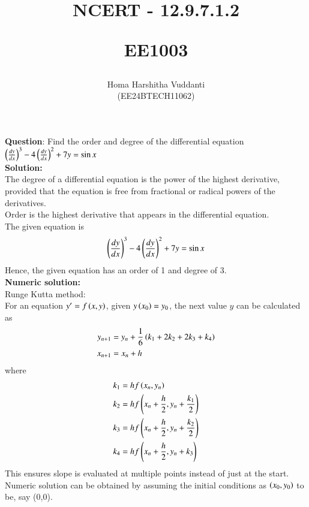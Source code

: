\documentclass[journal]{IEEEtran}
\begin{document}


\title{
NCERT - 12.9.7.1.2

\large{EE1003}
}
\author{Homa Harshitha Vuddanti

(EE24BTECH11062)
}	

\maketitle

\bigskip

\renewcommand{\thefigure}{\theenumi}
\renewcommand{\thetable}{\theenumi}
\textbf{Question}: Find the order and degree of the differential equation $\left(\frac{dy}{dx}\right)^3-4\left(\frac{dy}{dx}\right)^2+7y=\sin x$\\
\textbf{Solution:} \\
The degree of a differential equation is the power of the highest derivative, provided that the equation is free from fractional or radical powers of the derivatives.\\
Order is the highest derivative that appears in the differential equation.\\
The given equation is 
\begin{align}
\left(\frac{dy}{dx}\right)^3-4\left(\frac{dy}{dx}\right)^2+7y=\sin x \label{eq:1}
\end{align}
Hence, the given equation has an order of 1 and degree of 3.\\
\textbf{Numeric solution:}\\
Runge Kutta method:\\
For an equation $y^\prime=f\left(x,y\right)$, given $y\left(x_0\right)=y_0$, the next value $y$ can be calculated as
\begin{align}
y_{n+1}&=y_n+\frac{1}{6}\left(k_1+2k_2+2k_3+k_4\right)\\
x_{n+1}&=x_n+h
\end{align}
where
\begin{align}
k_1&=hf\left(x_n,y_n\right)\\
k_2&=hf\left(x_n+\frac{h}{2},y_n+\frac{k_1}{2}\right)\\
k_3&=hf\left(x_n+\frac{h}{2},y_n+\frac{k_2}{2}\right)\\
k_4&=hf\left(x_n+\frac{h}{2},y_n+k_3\right)
\end{align}
This ensures slope is evaluated at multiple points instead of just at the start. \\
Numeric solution can be obtained by assuming the initial conditions as $\left(x_0,y_0\right)$ to be, say (0,0).\\
\end{document}

